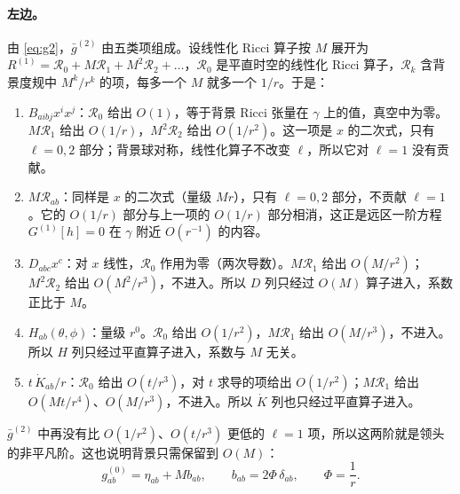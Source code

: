\documentclass[11pt,a4paper]{ctexart}
\numberwithin{equation}{section}
\begin{document}
\paragraph{左边。}由 \eqref{eq:g2}，$\bar g^{(2)}$ 由五类项组成。设线性化 Ricci 算子按 $M$ 展开为 $R^{(1)}=\mathcal R_0+M\mathcal R_1+M^2\mathcal R_2+\dots$，$\mathcal R_0$ 是平直时空的线性化 Ricci 算子，$\mathcal R_k$ 含背景度规中 $M^k/r^k$ 的项，每多一个 $M$ 就多一个 $1/r$。于是：
\begin{enumerate}
\item $B_{a i b j}x^ix^j$：$\mathcal R_0$ 给出 $O(1)$，等于背景 Ricci 张量在 $\gamma$ 上的值，真空中为零。$M\mathcal R_1$ 给出 $O(1/r)$，$M^2\mathcal R_2$ 给出 $O(1/r^2)$。这一项是 $x$ 的二次式，只有 $\ell=0,2$ 部分；背景球对称，线性化算子不改变 $\ell$，所以它对 $\ell=1$ 没有贡献。
\item $M\mathcal R_{ab}$：同样是 $x$ 的二次式（量级 $Mr$），只有 $\ell=0,2$ 部分，不贡献 $\ell=1$。它的 $O(1/r)$ 部分与上一项的 $O(1/r)$ 部分相消，这正是远区一阶方程 $G^{(1)}[h]=0$ 在 $\gamma$ 附近 $O(r^{-1})$ 的内容。
\item $D_{abc}x^c$：对 $x$ 线性，$\mathcal R_0$ 作用为零（两次导数）。$M\mathcal R_1$ 给出 $O(M/r^2)$；$M^2\mathcal R_2$ 给出 $O(M^2/r^3)$，不进入。所以 $D$ 列只经过 $O(M)$ 算子进入，系数正比于 $M$。
\item $H_{ab}(\theta,\phi)$：量级 $r^0$。$\mathcal R_0$ 给出 $O(1/r^2)$，$M\mathcal R_1$ 给出 $O(M/r^3)$，不进入。所以 $H$ 列只经过平直算子进入，系数与 $M$ 无关。
\item $t\,\dot K_{ab}/r$：$\mathcal R_0$ 给出 $O(t/r^3)$，对 $t$ 求导的项给出 $O(1/r^2)$；$M\mathcal R_1$ 给出 $O(Mt/r^4)$、$O(M/r^3)$，不进入。所以 $\dot K$ 列也只经过平直算子进入。
\end{enumerate}
$\bar g^{(2)}$ 中再没有比 $O(1/r^2)$、$O(t/r^3)$ 更低的 $\ell=1$ 项，所以这两阶就是领头的非平凡阶。这也说明背景只需保留到 $O(M)$：
\begin{equation}
g^{(0)}_{ab}=\eta_{ab}+M b_{ab},\qquad b_{ab}=2\Phi\,\delta_{ab},\qquad \Phi=\frac1r .
\label{eq:bg1}
\end{equation}
\end{document}
